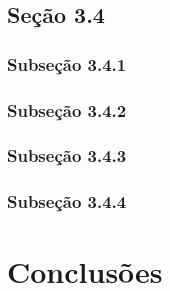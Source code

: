 \documentclass[
	12pt,				%
	openright,			%
	oneside,			%
	a4paper,			%
	chapter=TITLE,		%
	subsection=TITLE,	%
	english,			%
	brazilian,				%
	]{abntex2}
\begin{document}
\subsection*{Seção 3.4}
\subsubsection*{Subseção 3.4.1}

\subsubsection*{Subseção 3.4.2}

\subsubsection*{Subseção 3.4.3}

\subsubsection*{Subseção 3.4.4}

\section*{Conclusões}

% 
% 

\end{document}
